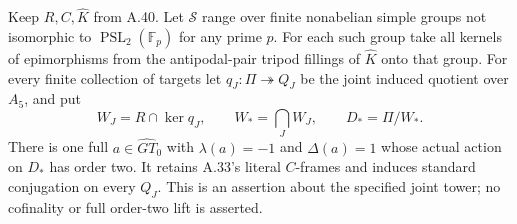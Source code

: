 Keep \(R,C,\widehat K\) from A.40. Let
\(\mathscr S\) range over finite nonabelian simple
groups not isomorphic to
\(\operatorname{PSL}_2(\mathbb F_p)\) for any
prime \(p\). For each such group take all kernels
of epimorphisms from the antipodal-pair tripod
fillings of \(\widehat K\) onto that group.
For every finite collection of targets let
\(q_J:\Pi\twoheadrightarrow Q_J\) be the joint
induced quotient over \(A_5\), and put
\[
 W_J=R\cap\ker q_J,
 \qquad W_* =\bigcap_J W_J,
 \qquad D_* =\Pi/W_*.
 \tag{A.41.1}
\]
There is one full \(a\in\widehat{GT}_0\) with
\(\lambda(a)=-1\) and \(\Delta(a)=1\) whose
actual action on \(D_*\) has order two.
It retains A.33's literal \(C\)-frames and
induces standard conjugation on every \(Q_J\).
This is an assertion about the specified joint
tower; no cofinality or full order-two lift is
asserted.

